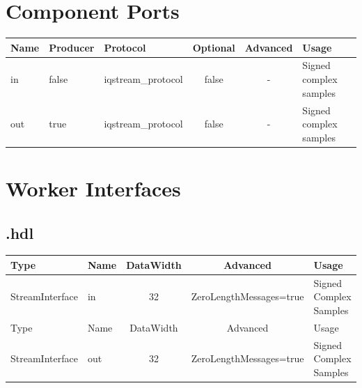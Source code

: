 \begin{landscape}
	\section*{Component Ports}
	\begin{scriptsize}
		\begin{tabular}{|M{2cm}|M{1.5cm}|M{4cm}|c|c|M{9cm}|}
			\hline
			Name & Producer & Protocol           & Optional & Advanced & Usage                  \\
			\hline
			in   & false    & iqstream\_protocol & false    & -        & Signed complex samples \\
			\hline
			out  & true     & iqstream\_protocol & false    & -        & Signed complex samples \\
			\hline
		\end{tabular}
	\end{scriptsize}

	\section*{Worker Interfaces}
	\subsection*{\comp.hdl}
	\begin{scriptsize}
		\begin{tabular}{|M{2cm}|M{1.5cm}|c|c|M{12cm}|}
			\hline
			\rowcolor{blue}
			Type            & Name & DataWidth & Advanced                & Usage                  \\
			\hline
			StreamInterface & in   & 32        & ZeroLengthMessages=true & Signed Complex Samples \\
			\hline
			\rowcolor{blue}
			Type            & Name & DataWidth & Advanced                & Usage                  \\
			\hline
			StreamInterface & out  & 32        & ZeroLengthMessages=true & Signed Complex Samples \\
			\hline
		\end{tabular}
	\end{scriptsize}
\end{landscape}

